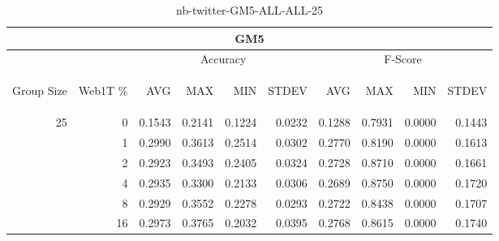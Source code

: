 \begin{center}
\begin{table}[htbp]
\begin{tabular}{ | r | r | r | r | r | r | r | r | r | r |}
\hline
\multicolumn{10}{|c|}{GM5}\\
\hline
 & & \multicolumn{4}{|c|}{Accuracy} & \multicolumn{4}{|c|}{F-Score}\\ \cline{3-10}
\begin{sideways}Group Size\end{sideways} & \begin{sideways}Web1T \%\end{sideways} & \begin{sideways}AVG\end{sideways} & \begin{sideways}MAX\end{sideways} & \begin{sideways}MIN\end{sideways} & \begin{sideways}STDEV\end{sideways} & \begin{sideways}AVG\end{sideways} & \begin{sideways}MAX\end{sideways} & \begin{sideways}MIN\end{sideways} & \begin{sideways}STDEV\end{sideways}\\
\hline
\multirow{5}{*}{25}
 & 0 & 0.1543 & 0.2141 & 0.1224 & 0.0232 & 0.1288 & 0.7931 & 0.0000 & 0.1443\\ \cline{2-10}
 & 1 & 0.2990 & 0.3613 & 0.2514 & 0.0302 & 0.2770 & 0.8190 & 0.0000 & 0.1613\\ \cline{2-10}
 & 2 & 0.2923 & 0.3493 & 0.2405 & 0.0324 & 0.2728 & 0.8710 & 0.0000 & 0.1661\\ \cline{2-10}
 & 4 & 0.2935 & 0.3300 & 0.2133 & 0.0306 & 0.2689 & 0.8750 & 0.0000 & 0.1720\\ \cline{2-10}
 & 8 & 0.2929 & 0.3552 & 0.2278 & 0.0293 & 0.2722 & 0.8438 & 0.0000 & 0.1707\\ \cline{2-10}
 & 16 & 0.2973 & 0.3765 & 0.2032 & 0.0395 & 0.2768 & 0.8615 & 0.0000 & 0.1740\\ \cline{2-10}
\hline
\end{tabular}
\caption{nb-twitter-GM5-ALL-ALL-25}
\label{table:nb-twitter-GM5-ALL-ALL-25}
\end{table}
\end{center}

